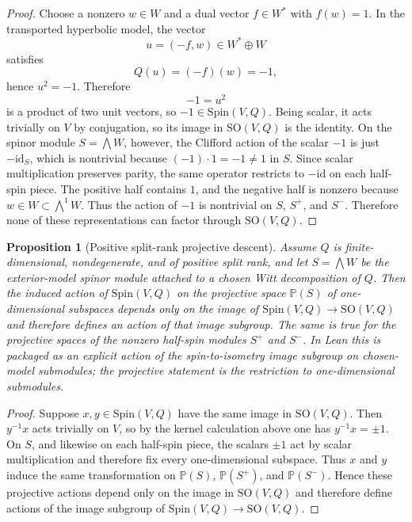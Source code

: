 \documentclass[11pt,a4paper]{article}
\theoremstyle{plain}
\newtheorem{proposition}[theorem]{Proposition}
\theoremstyle{definition}
\theoremstyle{remark}
\newcommand{\Spin}{\mathrm{Spin}}
\newcommand{\SO}{\mathrm{SO}}
\begin{document}
\begin{proof}
Choose a nonzero $w\in W$ and a dual vector $f\in W^*$ with $f(w)=1$. In the
transported hyperbolic model, the vector
\[
  u=(-f,w)\in W^*\oplus W
\]
satisfies
\[
  Q(u)=(-f)(w)=-1,
\]
hence $u^2=-1$. Therefore
\[
  -1=u^2
\]
is a product of two unit vectors, so $-1\in \Spin(V,Q)$. Being scalar, it acts
trivially on $V$ by conjugation, so its image in $\SO(V,Q)$ is the identity.
On the spinor module $S=\bigwedge W$, however, the Clifford action of the
scalar $-1$ is just $-\mathrm{id}_S$, which is nontrivial because
$(-1)\cdot 1=-1\neq 1$ in $S$. Since scalar multiplication preserves parity,
the same operator restricts to $-\mathrm{id}$ on each half-spin piece. The
positive half contains $1$, and the negative half is nonzero because
$w\in W\subset \bigwedge^1 W$. Thus the action of $-1$ is nontrivial on $S$,
$S^+$, and $S^-$. Therefore none of these representations can factor through
$\SO(V,Q)$.
\end{proof}

\begin{proposition}[Positive split-rank projective descent]
\label{prop:projective-descent}
Assume $Q$ is finite-dimensional, nondegenerate, and of positive split rank,
and let $S=\bigwedge W$ be the exterior-model spinor module attached to a
chosen Witt decomposition of $Q$. Then the induced action of $\Spin(V,Q)$ on
the projective space $\mathbb{P}(S)$ of one-dimensional subspaces depends only
on the image of $\Spin(V,Q)\to\SO(V,Q)$ and therefore defines an action of
that image subgroup. The same is true for the projective spaces of the nonzero
half-spin modules $S^+$ and $S^-$. In Lean this is packaged as an explicit
action of the spin-to-isometry image subgroup on chosen-model submodules; the
projective statement is the restriction to one-dimensional submodules.
\end{proposition}

\begin{proof}
Suppose $x,y\in \Spin(V,Q)$ have the same image in $\SO(V,Q)$. Then
$y^{-1}x$ acts trivially on $V$, so by the kernel calculation above one has
$y^{-1}x=\pm1$. On $S$, and likewise on each half-spin piece, the scalars
$\pm1$ act by scalar multiplication and therefore fix every one-dimensional
subspace. Thus $x$ and $y$ induce the same transformation on
$\mathbb{P}(S)$, $\mathbb{P}(S^+)$, and $\mathbb{P}(S^-)$. Hence these
projective actions depend only on the image in $\SO(V,Q)$ and therefore define
actions of the image subgroup of $\Spin(V,Q)\to\SO(V,Q)$.
\end{proof}
\end{document}
